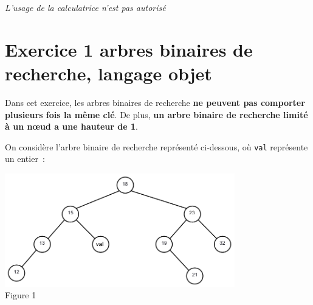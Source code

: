 \documentclass[a4paper,12pt,french]{book}
\begin{document}

\begin{center}
\textit{L'usage de la calculatrice n'est pas autorisé}\\[2em]
\end{center}

\section*{Exercice 1 \small{\hfill arbres binaires de recherche, langage objet}}
Dans cet exercice, les arbres binaires de recherche \textbf{ne peuvent pas comporter plusieurs fois la même clé}. De plus,\textbf{ un arbre binaire de recherche limité à un nœud a une hauteur de 1}.

On considère l’arbre binaire de recherche représenté ci-dessous, où \texttt{val} représente un entier :
\begin{center}
\includegraphics[width=10cm]{img/arbre}\\

Figure 1\\[1em]

\end{center}
\end{document}
